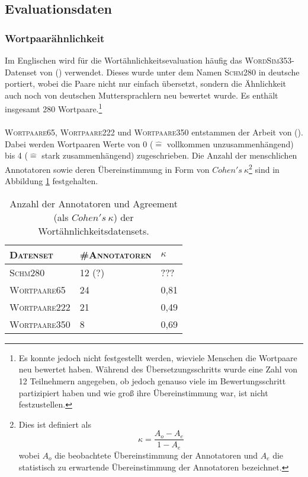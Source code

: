   \subsection{Evaluationsdaten}\label{sec:evaldata}

    \subsubsection{Wortpaarähnlichkeit}

    Im Englischen wird für die Wortähnlichkeitsevaluation häufig das \textsc{WordSim353}-Datenset von (\cite{finkelstein2001placing})
    verwendet. Dieses wurde unter dem Namen \textsc{Schm280} in deutsche portiert, wobei die Paare nicht nur einfach übersetzt, sondern die
    Ähnlichkeit auch noch von deutschen Muttersprachlern neu bewertet wurde. Es enthält insgesamt 280 Wortpaare.\footnote{Es konnte
    jedoch nicht festgestellt werden, wieviele Menschen die Wortpaare neu bewertet haben. Während des Übersetzungsschritts
    wurde eine Zahl von 12 Teilnehmern angegeben, ob jedoch genauso viele im Bewertungsschritt partizipiert haben und wie groß
    ihre Übereinstimmung war, ist nicht festzustellen.}\\ \\
    \textsc{Wortpaare65}, \textsc{Wortpaare222} und \textsc{Wortpaare350} entstammen der Arbeit von (\cite{rubenstein1965contextual}).
    Dabei werden Wortpaaren
    Werte von 0 ($\hat{=}$ vollkommen unzusammenhängend) bis 4 ($\hat{=}$ stark zusammenhängend) zugeschrieben. Die Anzahl
    der menschlichen Annotatoren sowie deren Übereinstimmung in Form von $Cohen's\ \kappa$\footnote{
    Dies ist definiert als
    \[
      \kappa = \frac{A_o - A_e}{1 - A_e}
    \]
    wobei $A_o$ die beobachtete Übereinstimmung der Annotatoren und $A_e$ die statistisch zu erwartende Übereinstimmung
    der Annotatoren bezeichnet.
    } sind in Abbildung \ref{fig:evalsets} festgehalten.

    \begin{table}[h]
      \centering
      \def\arraystretch{1.5}
      \begin{tabular}{@{}lll@{}}
        \toprule
        \textsc{Datenset} & \textsc{\#Annotatoren} & $\kappa$ \\
        \toprule
        \textsc{Schm280} & 12 (?) & ??? \\
        \textsc{Wortpaare65} & 24 & 0,81 \\
        \textsc{Wortpaare222} & 21 & 0,49 \\
        \textsc{Wortpaare350} & 8 & 0,69 \\
        \bottomrule
      \end{tabular}
      \caption[Anzahl der Annotatoren und Agreement der Wortähnlichkeitsdatensets]{Anzahl der Annotatoren und Agreement (als $Cohen's\ \kappa$) der Wortähnlichkeitsdatensets.
      \label{fig:evalsets}}
    \end{table}

